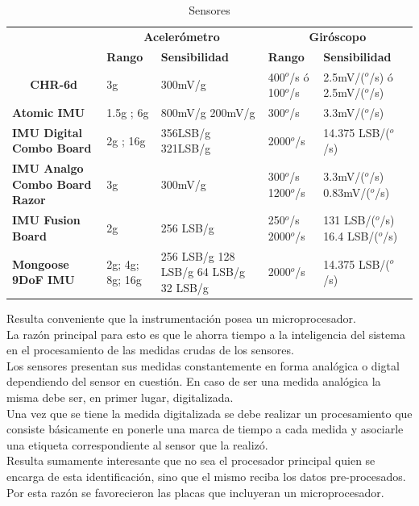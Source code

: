 \documentclass[main]{subfiles}
\begin{document}
\begin{table}[H]
\begin{tabular}{p{130pt}|p{70pt}|p{65pt}|p{55pt}|p{90pt}|} 
\cline{2-5} 
& \multicolumn{2}{|c|}{\cellcolor[gray]{0.7}\textbf{Aceler\'ometro}} 
& \multicolumn{2}{|c|}{\cellcolor[gray]{0.7}\textbf{Gir\'oscopo}}  \\ \cline{2-5}
& \cellcolor[gray]{0.8} \textbf{Rango} 
& \cellcolor[gray]{0.8} \textbf{Sensibilidad}
& \cellcolor[gray]{0.8} \textbf{Rango} 
& \cellcolor[gray]{0.8} \textbf{Sensibilidad} \\ \cline{2-5} \hline
\multicolumn{1}{|c|}{\cellcolor[gray]{0.8}\textbf{CHR-6d}}
& 3g & 300mV/g &  400$^o$/s \'o 100$^o$/s &  2.5mV/($^o$/s) \'o 2.5mV/($^o$/s) \\ \hline
\multicolumn{1}{|p{130pt}|}{\cellcolor[gray]{0.8}\textbf{Atomic IMU}}
&  1.5g  ;  6g &  800mV/g   200mV/g &  300$^o$/s  &  3.3mV/($^o$/s)\\ \hline
\multicolumn{1}{|p{130pt}|}{\cellcolor[gray]{0.8}\textbf{IMU Digital Combo Board}}
&  2g  ;  16g &  356LSB/g   321LSB/g &  2000$^o$/s  &  14.375 LSB/($^o$/s)\\ \hline
\multicolumn{1}{|p{130pt}|}{\cellcolor[gray]{0.8}\textbf{IMU Analgo Combo Board Razor}}
&  3g &  300mV/g  &  300$^o$/s  1200$^o$/s &  3.3mV/($^o$/s)  0.83mV/($^o$/s)\\ \hline
\multicolumn{1}{|p{130pt}|}{\cellcolor[gray]{0.8}\textbf{IMU Fusion Board}}
&  2g &  256 LSB/g  &  250$^o$/s  2000$^o$/s &  131 LSB/($^o$/s)     16.4 LSB/($^o$/s)\\ \hline
\multicolumn{1}{|p{130pt}|}{\cellcolor[gray]{0.8}\textbf{Mongoose 9DoF IMU}}
&  2g; 4g; 8g; 16g &  256 LSB/g 128 LSB/g 64 LSB/g \emph{} 32 LSB/g  & 2000$^o$/s & 14.375 LSB/($^o$/s)\\
\hline 
\end{tabular}
\caption{Sensores}
\label{tab:sensores}
\end{table}

Resulta conveniente que la instrumentaci\'on posea un microprocesador.\\
La raz\'on principal para esto es que le ahorra tiempo a la inteligencia del sistema en el procesamiento de las medidas crudas de los sensores.\\
Los sensores presentan sus medidas constantemente en forma anal\'ogica o digtal dependiendo del sensor en cuesti\'on. En caso de ser una medida anal\'ogica  la misma debe ser, en primer lugar, digitalizada.\\
Una vez que se tiene la medida digitalizada se debe realizar un procesamiento que consiste b\'asicamente en ponerle una marca de tiempo a cada medida y asociarle una etiqueta correspondiente al sensor que la realiz\'o. \\
Resulta sumamente interesante que no sea el procesador principal quien se encarga de esta identificaci\'on, sino que el mismo reciba los datos pre-procesados. Por esta raz\'on se favorecieron las placas que incluyeran un microprocesador. 
\end{document}
